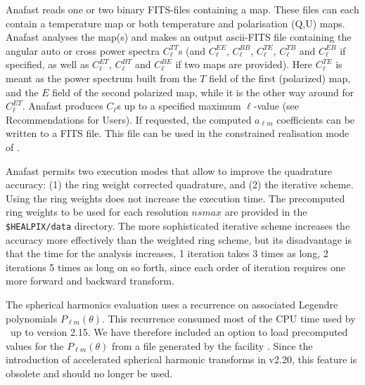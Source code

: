 \begin{qualifiers}
\begin{qulist}{}
  \end{qulist}
\end{qualifiers}
\vfill

\begin{codedescription}
{Anafast reads one or two binary FITS-files containing a \healpix map. These
files can each contain
a temperature map or both temperature and polarisation (Q,U) maps. Anafast analyses
the map(s) and makes an output ascii-FITS file containing the angular auto or cross
power spectra $C^{TT}_\ell$s
(and $C^{EE}_\ell$, $C^{BB}_\ell$, $C^{TE}_\ell$, $C^{TB}_\ell$ and $C^{EB}_\ell$ if specified, as well
as $C^{ET}_\ell$, $C^{BT}_\ell$ and $C^{BE}_\ell$ if two maps are provided). 
Here $C^{TE}_\ell$ is meant as the power
spectrum built from the $T$ field of the first (polarized) map, and the $E$
field of the second polarized map, while it is the other way around for $C^{ET}_\ell$.
Anafast produces $C_\ell$s up to a specified maximum $\ell$-value
(see Recommendations for Users). 
If requested, the computed $a_{\ell m}$ coefficients 
can  be written to a FITS file. This file can be used in the 
constrained realisation mode  of  . 

Anafast permits two execution modes that allow to improve 
the quadrature accuracy: 
(1) the  ring weight corrected quadrature, and
(2)  the  iterative scheme. 
Using the ring weights does not increase the execution time.  
The precomputed ring weights to be used for each 
\healpix resolution $nsmax$ are provided in
the {\tt \$HEALPIX/data} directory. 
The more sophisticated iterative scheme increases the
accuracy more effectively than the weighted ring scheme,
but its disadvantage is that the time for the analysis
increases, 1 iteration takes 3 times as long, 2 iterations 5 times as
long on so forth, since each order of iteration requires one more forward
and backward transform. 

The spherical harmonics evaluation uses  a
recurrence on associated Legendre polynomials $P_{\ell m}(\theta)$. 
This recurrence consumed most of the CPU time used by \thedocid\ up to version
2.15. We have therefore included an option to load precomputed values for the
$P_{\ell m}(\theta)$ from a file generated by the \healpix facility
. Since the introduction of accelerated spherical
harmonic transforms in \healpix v2.20, this feature is obsolete and should no
longer be used. 
}
\end{codedescription}

